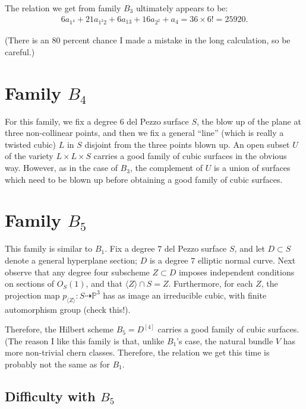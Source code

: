 \documentclass[12 pt]{amsart}
\renewcommand{\P}{\mathbb{P}}
\newcommand{\<}{\left\langle}
\renewcommand{\>}{\right\rangle}
\begin{document}
The relation we get from family $B_3$ ultimately appears to be:
\begin{align}
  \label{eq:relationB3}
  6a_{1^{4}} + 21a_{1^{2}2}+6a_{13}+16a_{2^{2}}+a_{4} = 36 \times 6! = 25920.
\end{align}

(There is an 80 percent chance I made a mistake in the long
calculation, so be careful.)

\section{Family $B_4$}
\label{sec:family-b_4}

For this family, we fix a degree $6$ del Pezzo surface $S$, the blow
up of the plane at three non-collinear points, and then we fix a
general ``line'' (which is really a twisted cubic) $L$ in $S$ disjoint
from the three points blown up.  An open subset $U$ of the variety
$L \times L \times S$ carries a good family of cubic surfaces in the
obvious way. However, as in the case of $B_3$, the complement of $U$
is a union of surfaces which need to be blown up before obtaining a
good family of cubic surfaces.


\section{Family $B_5$}
\label{sec:family-b_5-1}

This family is similar to $B_1$. Fix a degree $7$ del Pezzo surface
$S$, and let $D \subset S$ denote a general hyperplane section; $D$ is
a degree $7$ elliptic normal curve.  Next observe that any degree four
subscheme $Z \subset D$ imposes independent conditions on sections of
$O_{S}(1)$, and that $\langle Z \rangle \cap S = Z$.  Furthermore, for
each $Z$, the projection map
$p_{\langle Z \rangle}: S \dashrightarrow \P^{3}$ has as image an
irreducible cubic, with finite automorphism group (check this!).


Therefore, the Hilbert scheme $B_{5} = D^{[4]}$ carries a good family
of cubic surfaces.  (The reason I like this family is that, unlike
$B_1$'s case, the natural bundle $V$ has more non-trivial chern
classes. Therefore, the relation we get this time is probably not the
same as for $B_1$.

\subsection{Difficulty with $B_5$}
\label{sec:difficulty-with-b_5}
\end{document}
